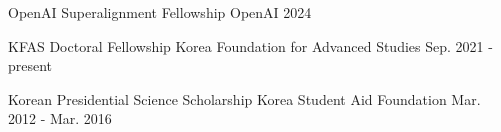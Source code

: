 
\vspace{8pt}

\begin{cvhonors}
  \cvhonor
    {OpenAI Superalignment Fellowship} %
    {OpenAI} %
    {2024} %

  \cvhonor
    {KFAS Doctoral Fellowship} %
    {Korea Foundation for Advanced Studies} %
    {Sep. 2021 - present} %


  \cvhonor
    {Korean Presidential Science Scholarship} %
    {Korea Student Aid Foundation} %
    {Mar. 2012 - Mar. 2016} %
\end{cvhonors}



    

